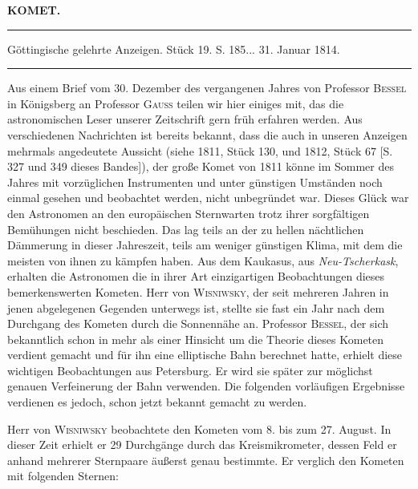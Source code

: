 \clearpage{}\hypertarget{native-378-lower}{}\label{native-378-lower}
\begin{center}\textbf{KOMET.}\par\vspace{4pt}\hrule\vspace{4pt}\fontsize{10}{12}\selectfont Göttingische gelehrte Anzeigen. Stück 19. S. 185\;... 31. Januar 1814.\par\vspace{4pt}\hrule\vspace{4pt}\end{center}

\par\indent Aus einem Brief vom 30. Dezember des vergangenen Jahres von Professor \textsc{Bessel} in Königsberg an Professor \textsc{Gauss} teilen wir hier einiges mit, das die astronomischen Leser unserer Zeitschrift gern früh erfahren werden. Aus verschiedenen Nachrichten ist bereits bekannt, dass die auch in unseren Anzeigen mehrmals angedeutete Aussicht (siehe 1811, Stück 130, und 1812, Stück 67 [S. 327 und 349 dieses Bandes]), der große Komet von 1811 könne im Sommer des Jahres mit vorzüglichen Instrumenten und unter günstigen Umständen noch einmal gesehen und beobachtet werden, nicht unbegründet war. Dieses Glück war den Astronomen an den europäischen Sternwarten trotz ihrer sorgfältigen Bemühungen nicht beschieden. Das lag teils an der zu hellen nächtlichen Dämmerung in dieser Jahreszeit, teils am weniger günstigen Klima, mit dem die meisten von ihnen zu kämpfen haben. Aus dem Kaukasus, aus \emph{Neu-Tscherkask}, erhalten die Astronomen die in ihrer Art einzigartigen Beobachtungen dieses bemerkenswerten Kometen. Herr von \textsc{Wisniwsky}, der seit mehreren Jahren in jenen abgelegenen Gegenden unterwegs ist, stellte sie fast ein Jahr nach dem Durchgang des Kometen durch die Sonnennähe an. Professor \textsc{Bessel}, der sich bekanntlich schon in mehr als einer Hinsicht um die Theorie dieses Kometen verdient gemacht und für ihn eine elliptische Bahn berechnet hatte, erhielt diese wichtigen Beobachtungen aus Petersburg. Er wird sie später zur möglichst genauen Verfeinerung der Bahn verwenden. Die folgenden vorläufigen Ergebnisse verdienen es jedoch, schon jetzt bekannt gemacht zu werden.

\par\indent Herr von \textsc{Wisniwsky} beobachtete den Kometen vom 8. bis zum 27. August. In dieser Zeit erhielt er 29 Durchgänge durch das Kreismikrometer, dessen Feld er anhand mehrerer Sternpaare äußerst genau bestimmte. Er verglich den Kometen mit folgenden Sternen:

